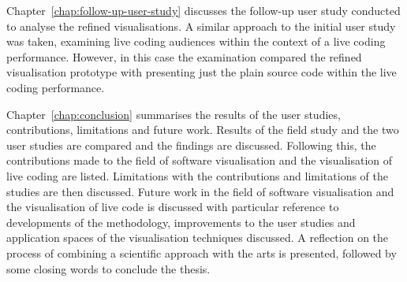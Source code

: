 Chapter~\ref{chap:follow-up-user-study} discusses the follow-up user study conducted to analyse the refined visualisations. A similar approach to the initial user study was taken, examining live coding audiences within the context of a live coding performance. However, in this case the examination compared the refined visualisation prototype with presenting just the plain source code within the live coding performance.

Chapter~\ref{chap:conclusion} summarises the results of the user studies, contributions, limitations and future work. Results of the field study and the two user studies are compared and the findings are discussed. Following this, the contributions made to the field of software visualisation and the visualisation of live coding are listed. Limitations with the contributions and limitations of the studies are then discussed. Future work in the field of software visualisation and the visualisation of live code is discussed with particular reference to developments of the methodology, improvements to the user studies and application spaces of the visualisation techniques discussed. A reflection on the process of combining a scientific approach with the arts is presented, followed by some closing words to conclude the thesis.


